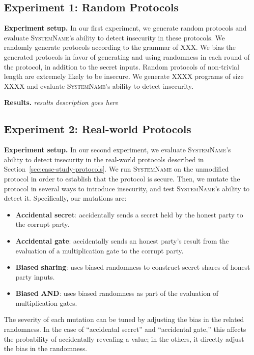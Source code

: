 \documentclass[conference]{IEEEtran}
\renewcommand{\paragraph}[1]{\vspace*{2pt}\noindent\textbf{#1}}
\newcommand{\system}{\textsc{SystemName}\xspace}
\begin{document}
\subsection{Experiment 1: Random Protocols}
\label{sec:experiment-1:-random}

\paragraph{Experiment setup.}
In our first experiment, we generate random protocols and evaluate \system's ability to detect insecurity in these protocols. We randomly generate protocols according to the grammar of XXX. We bias the generated protocols in favor of generating and using randomness in each round of the protocol, in addition to the secret inputs. Random protocols of non-trivial length are extremely likely to be insecure.
%
We generate XXXX programs of size XXXX and evaluate \system's ability to detect insecurity.

\paragraph{Results.}
\emph{results description goes here}


\subsection{Experiment 2: Real-world Protocols}
\label{sec:experiment-2:-real}

\paragraph{Experiment setup.}
In our second experiment, we evaluate \system's ability to detect insecurity in the real-world protocols described in Section~\ref{sec:case-study-protocols}. We run \system on the unmodified protocol in order to establish that the protocol is secure. Then, we mutate the protocol in several ways to introduce insecurity, and test \system's ability to detect it. Specifically, our mutations are:
%
\begin{itemize}
\item \textbf{Accidental secret}: accidentally sends a secret held by the honest party  to the corrupt party.
\item \textbf{Accidental gate}: accidentally sends an honest party's result from the evaluation of a multiplication gate to the corrupt party.
\item \textbf{Biased sharing}: uses biased randomness to construct secret shares of honest party inputs.
\item \textbf{Biased AND}: uses biased randomness as part of the evaluation of multiplication gates.
\end{itemize}
%
The severity of each mutation can be tuned by adjusting the bias in the related randomness. In the case of ``accidental secret'' and ``accidental gate,'' this affects the probability of accidentally revealing a value; in the others, it directly adjust the bias in the randomness.
\end{document}
